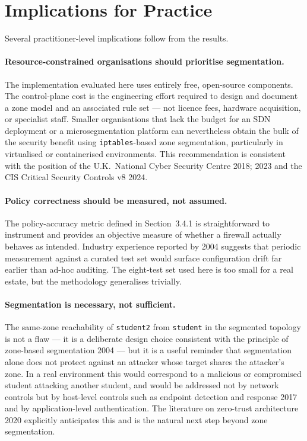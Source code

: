 \section{Implications for Practice}

Several practitioner-level implications follow from the results.

\paragraph{Resource-constrained organisations should prioritise segmentation.} The implementation evaluated here uses entirely free, open-source components. The control-plane cost is the engineering effort required to design and document a zone model and an associated rule set --- not licence fees, hardware acquisition, or specialist staff. Smaller organisations that lack the budget for an SDN deployment or a microsegmentation platform can nevertheless obtain the bulk of the security benefit using \texttt{iptables}-based zone segmentation, particularly in virtualised or containerised environments. This recommendation is consistent with the position of the U.K.\ National Cyber Security Centre \parencite{NCSC}{2018}; \parencite{NCSC}{2023} and the CIS Critical Security Controls v8 \parencite{CIS}{2024}.

\paragraph{Policy correctness should be measured, not assumed.} The policy-accuracy metric defined in Section~3.4.1 is straightforward to instrument and provides an objective measure of whether a firewall actually behaves as intended. Industry experience reported by \textcite{Wool}{2004} suggests that periodic measurement against a curated test set would surface configuration drift far earlier than ad-hoc auditing. The eight-test set used here is too small for a real estate, but the methodology generalises trivially.

\paragraph{Segmentation is necessary, not sufficient.} The same-zone reachability of \texttt{student2} from \texttt{student} in the segmented topology is not a flaw --- it is a deliberate design choice consistent with the principle of zone-based segmentation \parencite{Convery}{2004} --- but it is a useful reminder that segmentation alone does not protect against an attacker whose target shares the attacker's zone. In a real environment this would correspond to a malicious or compromised student attacking another student, and would be addressed not by network controls but by host-level controls such as endpoint detection and response \parencite{Stallings}{2017} and by application-level authentication. The literature on zero-trust architecture \parencite{Rose et al.}{2020} explicitly anticipates this and is the natural next step beyond zone segmentation.

